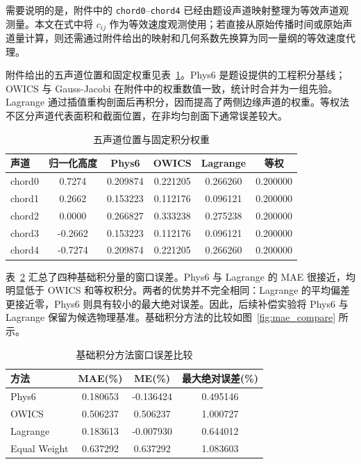 需要说明的是，附件中的 \texttt{chord0}--\texttt{chord4} 已经由题设声道映射整理为等效声道观测量。本文在式中将 $c_{ij}$ 作为等效速度观测使用；若直接从原始传播时间或原始声道量计算，则还需通过附件给出的映射和几何系数先换算为同一量纲的等效速度代理。

附件给出的五声道位置和固定权重见表~\ref{tab:integration_weights}。Phys6 是题设提供的工程积分基线；OWICS 与 Gauss-Jacobi 在附件中的权重数值一致，统计时合并为一组先验。Lagrange 通过插值重构剖面后再积分，因而提高了两侧边缘声道的权重。等权法不区分声道代表面积和截面位置，在非均匀剖面下通常误差较大。

\begin{table}[H]
\centering
\caption{五声道位置与固定积分权重}
\label{tab:integration_weights}
\small
\begin{tabular}{lccccc}
\toprule
声道 & 归一化高度 & Phys6 & OWICS & Lagrange & 等权 \\
\midrule
chord0 & 0.7274 & 0.209874 & 0.221205 & 0.266260 & 0.200000 \\
chord1 & 0.2662 & 0.153223 & 0.112176 & 0.096121 & 0.200000 \\
chord2 & 0.0000 & 0.266827 & 0.333238 & 0.275238 & 0.200000 \\
chord3 & -0.2662 & 0.153223 & 0.112176 & 0.096121 & 0.200000 \\
chord4 & -0.7274 & 0.209874 & 0.221205 & 0.266260 & 0.200000 \\
\bottomrule
\end{tabular}
\end{table}

表~\ref{tab:baseline_mae} 汇总了四种基础积分量的窗口误差。Phys6 与 Lagrange 的 MAE 很接近，均明显低于 OWICS 和等权积分。两者的优势并不完全相同：Lagrange 的平均偏差更接近零，Phys6 则具有较小的最大绝对误差。因此，后续补偿实验将 Phys6 与 Lagrange 保留为候选物理基准。基础积分方法的比较如图~\ref{fig:mae_compare} 所示。

\begin{table}[H]
\centering
\caption{基础积分方法窗口误差比较}
\label{tab:baseline_mae}
\begin{tabular}{lccc}
\toprule
方法 & MAE(\%) & ME(\%) & 最大绝对误差(\%) \\
\midrule
Phys6 & 0.180653 & -0.136424 & 0.495146 \\
OWICS & 0.506237 & 0.506237 & 1.000727 \\
Lagrange & 0.183613 & -0.007930 & 0.644012 \\
Equal Weight & 0.637292 & 0.637292 & 1.083603 \\
\bottomrule
\end{tabular}
\end{table}

